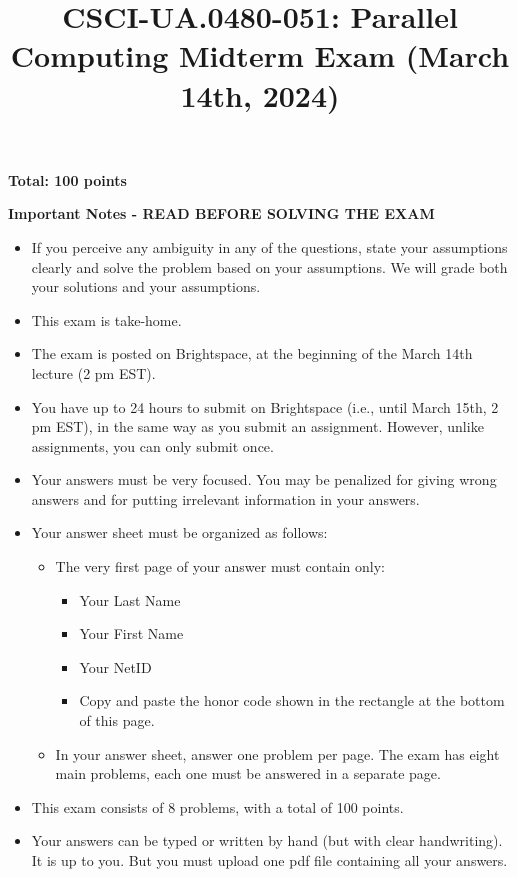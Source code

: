 \documentclass{article}
\title{CSCI-UA.0480-051: Parallel Computing Midterm Exam (March 14th, 2024)}
\author{}
\date{}
\begin{document}
\maketitle

\textbf{Total: 100 points}

\textbf{Important Notes - READ BEFORE SOLVING THE EXAM}

\begin{itemize}
    \item If you perceive any ambiguity in any of the questions, state your assumptions clearly and solve the problem based on your assumptions. We will grade both your solutions and your assumptions.
    \item This exam is take-home.
    \item The exam is posted on Brightspace, at the beginning of the March 14th lecture (2 pm EST).
    \item You have up to 24 hours to submit on Brightspace (i.e., until March 15th, 2 pm EST), in the same way as you submit an assignment. However, unlike assignments, you can only submit once.
    \item Your answers must be very focused. You may be penalized for giving wrong answers and for putting irrelevant information in your answers.
    \item Your answer sheet must be organized as follows:
    \begin{itemize}
        \item The very first page of your answer must contain only:
        \begin{itemize}
            \item Your Last Name
            \item Your First Name
            \item Your NetID
            \item Copy and paste the honor code shown in the rectangle at the bottom of this page.
        \end{itemize}
        \item In your answer sheet, answer one problem per page. The exam has eight main problems, each one must be answered in a separate page.
    \end{itemize}
    \item This exam consists of 8 problems, with a total of 100 points.
    \item Your answers can be typed or written by hand (but with clear handwriting). It is up to you. But you must upload one pdf file containing all your answers.
\end{itemize}
\end{document}
